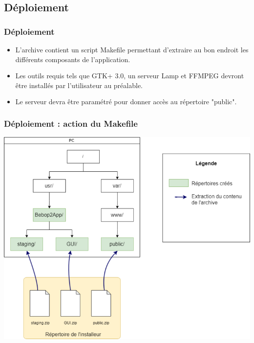 \documentclass{beamer}
\begin{document}
	
	
	\begin{frame}
	\section{Déploiement}
		\begin{center}
		\frametitle{Déploiement}
		\begin{itemize}
	    \item	L'archive contient un script Makefile permettant d'extraire au bon endroit les différents composants de l'application.\\
	    \item	Les outils requis tels que GTK+ 3.0, un serveur Lamp et FFMPEG devront être installés par l'utilisateur au préalable.\\
	    \item	Le serveur devra être paramétré pour donner accès au répertoire "public".\\
		\end{itemize}
		\end{center}
	\end{frame}
	
	
	\begin{frame}
		\begin{center}
		\frametitle{Déploiement : action du Makefile}
        \includegraphics[scale=0.3]{deploiement.png}
		\end{center}
	\end{frame}
	
\end{document}
